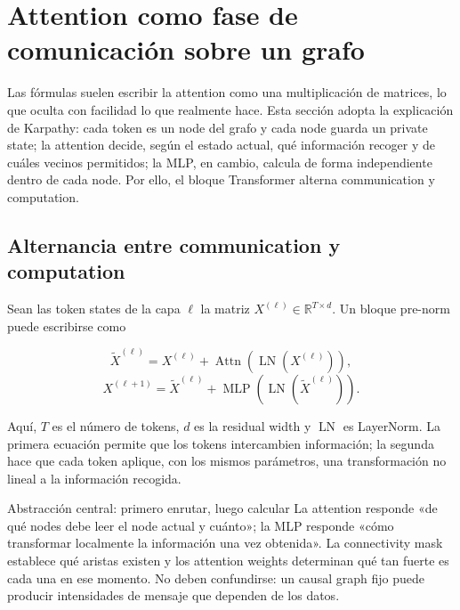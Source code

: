 \section{Attention como fase de comunicación sobre un grafo}

Las fórmulas suelen escribir la attention como una multiplicación de matrices, lo que oculta con facilidad lo que realmente hace. Esta sección adopta la explicación de Karpathy: cada token es un node del grafo y cada node guarda un private state; la attention decide, según el estado actual, qué información recoger y de cuáles vecinos permitidos; la MLP, en cambio, calcula de forma independiente dentro de cada node. Por ello, el bloque Transformer alterna communication y computation.

\subsection{Alternancia entre communication y computation}

Sean las token states de la capa $\ell$ la matriz $X^{(\ell)}\in\mathbb R^{T\times d}$. Un bloque pre-norm puede escribirse como

\[
\widetilde X^{(\ell)}=X^{(\ell)}+\operatorname{Attn}(\operatorname{LN}(X^{(\ell)})),
\]
\[
X^{(\ell+1)}=\widetilde X^{(\ell)}+\operatorname{MLP}(\operatorname{LN}(\widetilde X^{(\ell)})).
\]

Aquí, $T$ es el número de tokens, $d$ es la residual width y $\operatorname{LN}$ es LayerNorm. La primera ecuación permite que los tokens intercambien información; la segunda hace que cada token aplique, con los mismos parámetros, una transformación no lineal a la información recogida.


\begin{importantbox}{Abstracción central: primero enrutar, luego calcular}
La attention responde «de qué nodes debe leer el node actual y cuánto»; la MLP responde «cómo transformar localmente la información una vez obtenida». La connectivity mask establece qué aristas existen y los attention weights determinan qué tan fuerte es cada una en ese momento. No deben confundirse: un causal graph fijo puede producir intensidades de mensaje que dependen de los datos.
\end{importantbox}

